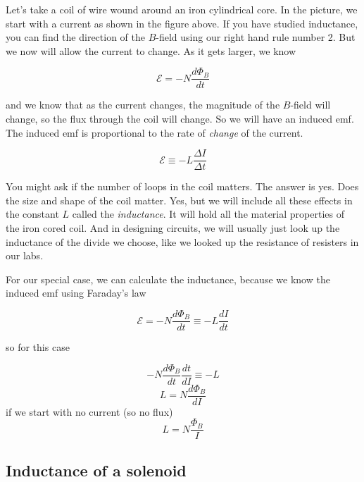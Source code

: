 Let's take a coil of wire wound around an iron cylindrical core. In the picture, we start with a current as shown in the figure above. If you have studied inductance, you can find the direction of the $B$-field using our right hand rule number 2. But we now will allow the current to change. As it gets larger, we know 

\begin{equation*}
	\mathcal{E}=-N\frac{d\Phi _{B}}{dt}
\end{equation*}

\noindent and we know that as the current changes, the magnitude of the $B$-field will change, so the flux through the coil will change. So we will have an induced emf. The induced emf is proportional to the rate of \emph{change} of the current.

\begin{equation*}
	\mathcal{E}\equiv -L\frac{\Delta I}{\Delta t}
\end{equation*}

You might ask if the number of loops in the coil matters. The answer is yes. Does the size and shape of the coil matter. Yes, but we will include all these effects in the constant $L$ called the \emph{inductance}. It will hold all the material properties of the iron cored coil. And in designing circuits, we will usually just look up the inductance of the divide we choose, like we looked up the resistance of resisters in our labs.

For our special case, we can calculate the inductance, because we know the induced emf using Faraday's law

\begin{equation*}
	\mathcal{E}=-N\frac{d\Phi _{B}}{dt}\equiv -L\frac{dI}{dt}
\end{equation*}

\noindent so for this case

\begin{equation*}
	-N\frac{d\Phi _{B}}{dt}\frac{dt}{dI}\equiv -L
\end{equation*}
\begin{equation*}
	L=N\frac{d\Phi _{B}}{dI}
\end{equation*}
if we start with no current (so no flux)%
\begin{equation*}
	L=N\frac{\Phi _{B}}{I}
\end{equation*}

\subsection{Inductance of a solenoid}

